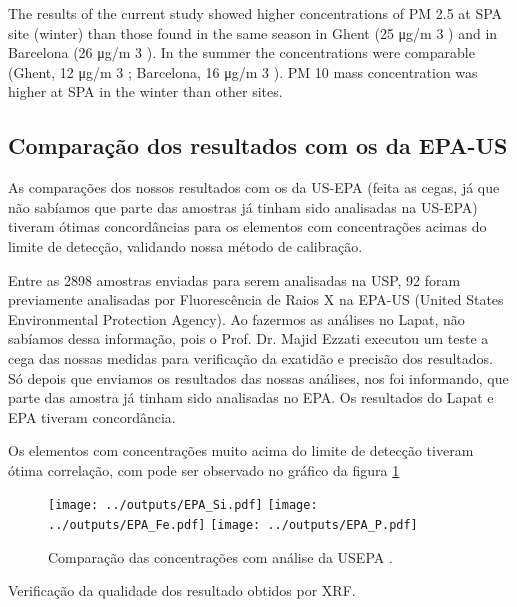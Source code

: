 The results of the current study showed higher concentrations
of PM 2.5 at SPA site (winter) than those found in the same
season in Ghent (25 μg/m 3 ) and in Barcelona (26 μg/m 3 ).
In the summer the concentrations were comparable (Ghent,
12 μg/m 3 ; Barcelona, 16 μg/m 3 ). PM 10 mass concentration
was higher at SPA in the winter than other sites.

\begin{table}[H]
  \centering
    
  \caption{}
\end{table}


\subsection{Comparação dos resultados com os da EPA-US}

As comparações dos nossos resultados com os da US-EPA (feita as cegas, já que não sabíamos que parte das amostras já tinham sido analisadas na US-EPA) tiveram ótimas concordâncias para os elementos com concentrações acimas do limite de detecção, validando nossa método de calibração.  

Entre as 2898 amostras enviadas para serem analisadas na USP, 92 foram previamente 
analisadas por Fluorescência de Raios X na EPA-US
(United States Environmental Protection Agency). 
Ao fazermos as análises no Lapat, não sabíamos
dessa informação, pois o Prof. Dr. Majid Ezzati executou um teste a cega das 
nossas medidas para verificação da exatidão e precisão dos resultados. 
Só depois que enviamos os resultados das nossas análises, nos foi informando, 
que parte das amostra já tinham sido analisadas no EPA. Os resultados do Lapat
e EPA tiveram concordância. 

Os elementos com concentrações muito acima do limite de detecção tiveram ótima
correlação, com pode ser observado no gráfico da figura \ref{fig:epa} 

\begin{figure}[H]
  \centering
    \texttt{[image: ../outputs/EPA\_Si.pdf]}
    \texttt{[image: ../outputs/EPA\_Fe.pdf]}
    \texttt{[image: ../outputs/EPA\_P.pdf]}
  \caption{Comparação das concentrações com análise da USEPA \label{fig:epa}.}
\end{figure}

Verificação da qualidade dos resultado obtidos por XRF.


